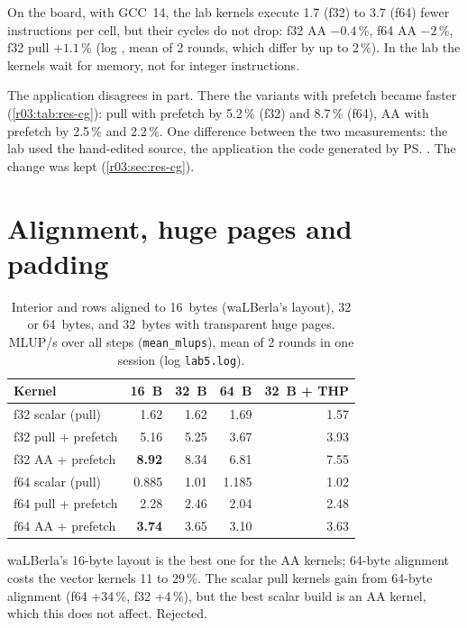 On the board, with GCC~14, the lab kernels execute 1.7 (f32) to 3.7 (f64) fewer instructions
per cell, but their cycles do not drop: f32 AA $-0.4$\,\%, f64 AA $-2$\,\%, f32 pull
$+1.1$\,\% (log , mean of 2 rounds, which differ by up to 2\,\%). In the lab
the kernels wait for memory, not for integer instructions.

The application disagrees in part. There the variants with prefetch became faster
(\cref{r03:tab:res-cg}): pull with prefetch by 5.2\,\% (f32) and 8.7\,\% (f64), AA with
prefetch by 2.5\,\% and 2.2\,\%. One difference between the two measurements: the lab used the
hand-edited source, the application the code generated by \ps{}. The change was kept
(\cref{r03:sec:res-cg}).

\section{Alignment, huge pages and padding}\label{r03:sec:lever-layout}

\begin{table}[htbp]
  \centering\small
  \caption{Interior and rows aligned to 16~bytes (waLBerla's layout), 32 or 64~bytes, and
    32~bytes with transparent huge pages. MLUP/s over all steps (\texttt{mean\_mlups}), mean of 2
    rounds in one session (log \texttt{lab5.log}).}\label{r03:tab:align}
  \begin{tabular}{@{}lrrrr@{}}
    \toprule
    \textbf{Kernel} & \textbf{16~B} & \textbf{32~B} & \textbf{64~B} & \textbf{32~B + THP}\\
    \midrule
    f32 scalar (pull) & 1.62 & 1.62 & 1.69 & 1.57\\
    f32 pull + prefetch & 5.16 & 5.25 & 3.67 & 3.93\\
    f32 AA + prefetch & \textbf{8.92} & 8.34 & 6.81 & 7.55\\
    f64 scalar (pull) & 0.885 & 1.01 & 1.185 & 1.02\\
    f64 pull + prefetch & 2.28 & 2.46 & 2.04 & 2.48\\
    f64 AA + prefetch & \textbf{3.74} & 3.65 & 3.10 & 3.63\\
    \bottomrule
  \end{tabular}
\end{table}

waLBerla's 16-byte layout is the best one for the AA kernels; 64-byte alignment costs the vector
kernels 11 to 29\,\%. The scalar pull kernels gain from 64-byte alignment (f64 +34\,\%, f32
+4\,\%), but the best scalar build is an AA kernel, which this does not affect. Rejected.

